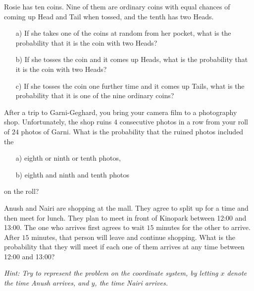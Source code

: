 \begin{problem}%
    Rosie has ten coins. Nine of them are ordinary coins with equal chances of coming up Head and Tail when tossed, and the tenth has two Heads.
    
    \begin{enumerate}
        \item[a) ] If she takes one of the coins at random from her pocket, what is the probability that it is the coin
with two Heads?

        \item[b) ] If she tosses the coin and it comes up Heads, what is the probability that it is the coin with two Heads?

        \item[c) ] If she tosses the coin one further time and it comes up Tails, what is the probability that it is one of
the nine ordinary coins?

    \end{enumerate}
\end{problem}
\medskip


\begin{problem}
After a trip to Garni-Geghard, you bring your camera film to a photography shop. Unfortunately, the shop ruins $4$ consecutive photos in a row from your roll of $24$ photos of Garni. What is the probability that the ruined photos included the
\begin{enumerate}
    \item[a) ] eighth or ninth or tenth photos,
    \item[b) ] eighth and ninth and tenth photos
\end{enumerate}
on the roll?
\end{problem}
\medskip


\begin{problem}
Anush and Nairi are shopping at the mall. They agree to split up for a time and then meet for lunch. They plan to meet in
front of Kinopark between 12:00 and 13:00. The one who arrives first agrees to wait $15$ minutes for the other to arrive. After $15$
minutes, that person will leave and continue shopping. What is the probability that they will meet if each one of them arrives at any time between 12:00 and 13:00?

\smallskip

\textit{Hint: Try to represent the problem on the coordinate system, by letting
$x$ denote the time Anush arrives, and $y$, the time Nairi arrives.}
\end{problem}
\medskip


